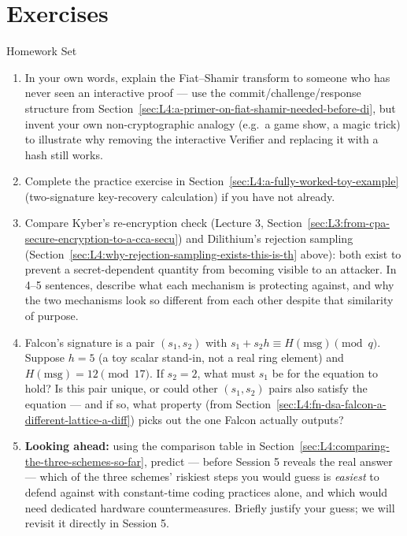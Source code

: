 \section{Exercises}
\label{sec:L4:exercises}

\begin{exercisebox}{Homework Set}
\begin{enumerate}[leftmargin=*]
  \item In your own words, explain the Fiat--Shamir transform to someone who has never seen an interactive proof --- use the commit/challenge/response structure from Section~\ref{sec:L4:a-primer-on-fiat-shamir-needed-before-di}, but invent your own non-cryptographic analogy (e.g.\ a game show, a magic trick) to illustrate why removing the interactive Verifier and replacing it with a hash still works.
  \item Complete the practice exercise in Section~\ref{sec:L4:a-fully-worked-toy-example} (two-signature key-recovery calculation) if you have not already.
  \item Compare Kyber's re-encryption check (Lecture 3, Section~\ref{sec:L3:from-cpa-secure-encryption-to-a-cca-secu}) and Dilithium's rejection sampling (Section~\ref{sec:L4:why-rejection-sampling-exists-this-is-th} above): both exist to prevent a secret-dependent quantity from becoming visible to an attacker. In 4--5 sentences, describe what each mechanism is protecting against, and why the two mechanisms look so different from each other despite that similarity of purpose.
  \item Falcon's signature is a pair $(s_1,s_2)$ with $s_1+s_2h\equiv H(\text{msg})\pmod q$. Suppose $h = 5$ (a toy scalar stand-in, not a real ring element) and $H(\text{msg})=12 \pmod{17}$. If $s_2 = 2$, what must $s_1$ be for the equation to hold? Is this pair unique, or could other $(s_1,s_2)$ pairs also satisfy the equation --- and if so, what property (from Section~\ref{sec:L4:fn-dsa-falcon-a-different-lattice-a-diff}) picks out the one Falcon actually outputs?
  \item \textbf{Looking ahead:} using the comparison table in Section~\ref{sec:L4:comparing-the-three-schemes-so-far}, predict --- before Session 5 reveals the real answer --- which of the three schemes' riskiest steps you would guess is \emph{easiest} to defend against with constant-time coding practices alone, and which would need dedicated hardware countermeasures. Briefly justify your guess; we will revisit it directly in Session 5.
\end{enumerate}
\end{exercisebox}
